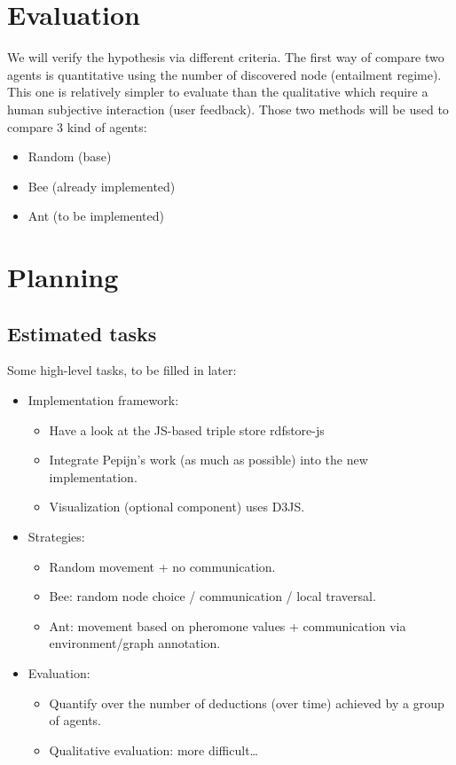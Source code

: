 \documentclass{article}
\newenvironment{itemh}[0]{\begin{itemize}[label=$\heartsuit$, font=\color{gray} \small]}{\end{itemize}}
\newenvironment{itemH}[0]{\begin{itemize}[label=$\heartsuit$, font=\color{gray} \large]}{\end{itemize}}
\begin{document}
\section{Evaluation}
	We will verify the hypothesis via different criteria.
	The first way of compare two agents is quantitative using the number of discovered node (entailment regime).
	This one is relatively simpler to evaluate than the qualitative which require a human subjective interaction (user feedback).
	Those two methods will be used to compare 3 kind of agents:
	\begin{itemh}
		\item Random (base)
		\item Bee (already implemented)
		\item Ant (to be implemented)
	\end{itemh}

\newpage
\section{Planning}
	\subsection{Estimated tasks}
		Some high-level tasks, to be filled in later:
		\begin{itemH}
			\item Implementation framework:
				\begin{itemh}
					\item Have a look at the JS-based triple store rdfstore-js
					\item Integrate Pepijn’s work (as much as possible)  into the new implementation.
					\item Visualization (optional component) uses D3JS.
				\end{itemh}
			\item Strategies:
				\begin{itemh}
					\item Random movement + no communication.
					\item Bee: random node choice / communication / local traversal.
					\item Ant: movement based on pheromone values + communication via environment/graph annotation.
				\end{itemh}
			\item Evaluation:
				\begin{itemh}
					\item Quantify over the number of deductions (over time) achieved by a group of agents.
					\item Qualitative evaluation: more difficult…
				\end{itemh}
		\end{itemH}
\end{document}
